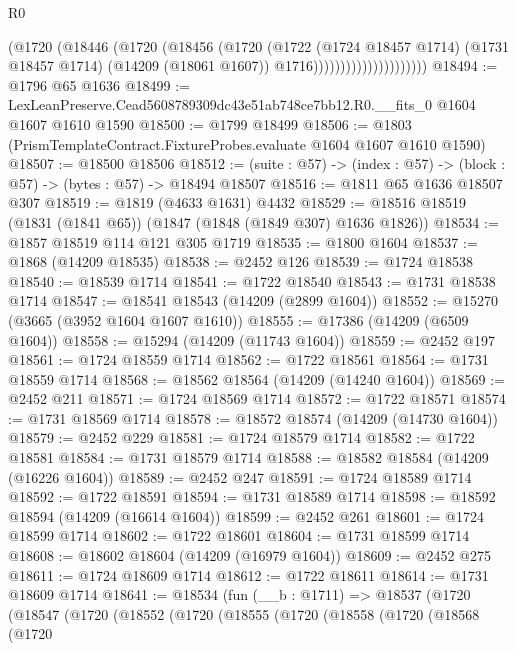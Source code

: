 \begin{lexlean}{R0}
\begin{coremodule}
                                  (@1720
                                    (@18446
                                      (@1720
                                        (@18456
                                          (@1720
                                            (@1722
                                              (@1724 @18457 @1714)
                                              (@1731 @18457 @1714)
                                              (@14209 (@18061 @1607))
                                              @1716)))))))))))))))))))))
@18494 := @1796 @65 @1636
@18499 := LexLeanPreserve.Cead5608789309dc43e51ab748ce7bb12.R0.__fits_0 @1604 @1607 @1610 @1590
@18500 := @1799 @18499
@18506 := @1803 (PrismTemplateContract.FixtureProbes.evaluate @1604 @1607 @1610 @1590)
@18507 := @18500 @18506
@18512 := (suite : @57) -> (index : @57) -> (block : @57) -> (bytes : @57) -> @18494 @18507
@18516 := @1811 @65 @1636 @18507 @307
@18519 := @1819 (@4633 @1631) @4432
@18529 := @18516 @18519 (@1831 (@1841 @65)) (@1847 (@1848 (@1849 @307) @1636 @1826))
@18534 := @1857 @18519 @114 @121 @305 @1719
@18535 := @1800 @1604
@18537 := @1868 (@14209 @18535)
@18538 := @2452 @126
@18539 := @1724 @18538
@18540 := @18539 @1714
@18541 := @1722 @18540
@18543 := @1731 @18538 @1714
@18547 := @18541 @18543 (@14209 (@2899 @1604))
@18552 := @15270 (@3665 (@3952 @1604 @1607 @1610))
@18555 := @17386 (@14209 (@6509 @1604))
@18558 := @15294 (@14209 (@11743 @1604))
@18559 := @2452 @197
@18561 := @1724 @18559 @1714
@18562 := @1722 @18561
@18564 := @1731 @18559 @1714
@18568 := @18562 @18564 (@14209 (@14240 @1604))
@18569 := @2452 @211
@18571 := @1724 @18569 @1714
@18572 := @1722 @18571
@18574 := @1731 @18569 @1714
@18578 := @18572 @18574 (@14209 (@14730 @1604))
@18579 := @2452 @229
@18581 := @1724 @18579 @1714
@18582 := @1722 @18581
@18584 := @1731 @18579 @1714
@18588 := @18582 @18584 (@14209 (@16226 @1604))
@18589 := @2452 @247
@18591 := @1724 @18589 @1714
@18592 := @1722 @18591
@18594 := @1731 @18589 @1714
@18598 := @18592 @18594 (@14209 (@16614 @1604))
@18599 := @2452 @261
@18601 := @1724 @18599 @1714
@18602 := @1722 @18601
@18604 := @1731 @18599 @1714
@18608 := @18602 @18604 (@14209 (@16979 @1604))
@18609 := @2452 @275
@18611 := @1724 @18609 @1714
@18612 := @1722 @18611
@18614 := @1731 @18609 @1714
@18641 := @18534
    (fun (__b : @1711) =>
    @18537
      (@1720
        (@18547
          (@1720
            (@18552
              (@1720
                (@18555
                  (@1720
                    (@18558
                      (@1720
                        (@18568
                          (@1720

\end{coremodule}
\end{lexlean}
